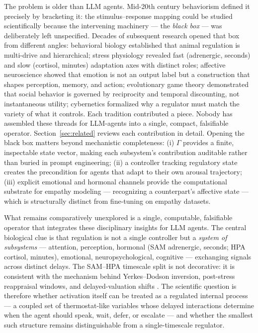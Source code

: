 \documentclass{article}
\begin{document}
The problem is older than LLM agents. Mid-20th century behaviorism defined it precisely by bracketing it: the stimulus--response mapping could be studied scientifically because the intervening machinery --- the \textit{black box} --- was deliberately left unspecified. Decades of subsequent research opened that box from different angles: behavioral biology established that animal regulation is multi-drive and hierarchical; stress physiology revealed fast (adrenergic, seconds) and slow (cortisol, minutes) adaptation axes with distinct roles; affective neuroscience showed that emotion is not an output label but a construction that shapes perception, memory, and action; evolutionary game theory demonstrated that social behavior is governed by reciprocity and temporal discounting, not instantaneous utility; cybernetics formalized why a regulator must match the variety of what it controls. Each tradition contributed a piece. Nobody has assembled these threads for LLM-agents into a single, compact, falsifiable operator. Section~\ref{sec:related} reviews each contribution in detail. Opening the black box matters beyond mechanistic completeness: (i) $\Gamma$ provides a finite, inspectable state vector, making each subsystem's contribution auditable rather than buried in prompt engineering; (ii) a controller tracking regulatory state creates the precondition for agents that adapt to their own arousal trajectory; (iii) explicit emotional and hormonal channels provide the computational substrate for empathy modeling --- recognizing a counterpart's affective state --- which is structurally distinct from fine-tuning on empathy datasets.

What remains comparatively unexplored is a single, computable, falsifiable operator that integrates these disciplinary insights for LLM agents. The central biological clue is that regulation is not a single controller but a \textit{system of subsystems} --- attention, perception, hormonal (SAM adrenergic, seconds; HPA cortisol, minutes), emotional, neuropsychological, cognitive --- exchanging signals across distinct delays. The SAM--HPA timescale split is not decorative: it is consistent with the mechanism behind Yerkes--Dodson inversion, post-stress reappraisal windows, and delayed-valuation shifts \citep{porcelli2017stress}. The scientific question is therefore whether activation itself can be treated as a regulated internal process --- a coupled set of thermostat-like variables whose delayed interactions determine when the agent should speak, wait, defer, or escalate --- and whether the smallest such structure remains distinguishable from a single-timescale regulator.
\end{document}
